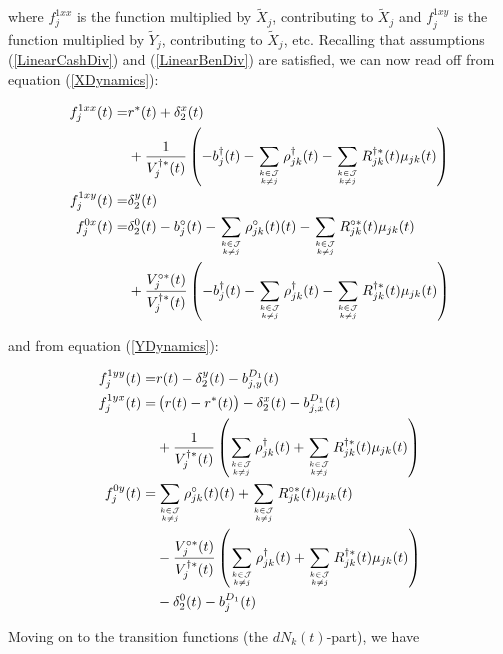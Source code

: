 \documentclass{article}
\newcommand{\1}[1]{\mathbbm{1}_{\left\lbrace #1 \right\rbrace}}
\theoremstyle{break}
\theoremstyle{remark}
\numberwithin{equation}{section}
\begin{document}
\begin{appendices}
where $f_j^{1xx}$ is the function multiplied by $\tilde{X}_j$, contributing to $\tilde{X}_j$ and $f_j^{1xy}$ is the function multiplied by $\tilde{Y}_j$, contributing to $\tilde{X}_j$, etc. Recalling that assumptions (\ref{LinearCashDiv}) and (\ref{LinearBenDiv}) are satisfied, we can now read off from equation (\ref{XDynamics}):

\begin{align*}
	f_j^{1xx}(t) =& r^*(t) + \delta_2^x(t) \\
	&+ \frac{1}{V_j^{\dagger *}(t)} \left( -b_j^\dagger(t) - \sum_{k \in \mathcal{J} \atop k \neq j} \rho_{jk}^\dagger(t) - \sum_{k \in \mathcal{J} \atop k \neq j} R_{jk}^{\dagger*}(t) \mu_{jk}(t) \right) \\
	f_j^{1xy}(t) =& \delta_2^y(t)\\
	f_j^{0x}(t) =& \delta_2^0(t) - b_j^\circ(t) - \sum_{k \in \mathcal{J} \atop k \neq j} \rho_{jk}^\circ(t)(t) - \sum_{k \in \mathcal{J} \atop k \neq j} R_{jk}^{\circ*}(t) \mu_{jk}(t) \\
	&+ \frac{V_j^{\circ *}(t)}{V_j^{\dagger *}(t)} \left( -b_j^\dagger(t) - \sum_{k \in \mathcal{J} \atop k \neq j} \rho_{jk}^\dagger(t) - \sum_{k \in \mathcal{J} \atop k \neq j} R_{jk}^{\dagger*}(t) \mu_{jk}(t) \right)
\end{align*}

and from equation (\ref{YDynamics}):

\begin{align*}
	f_j^{1yy}(t) =& r(t) - \delta_2^y(t) - b_{j,y}^{D_1}(t) \\
	f_j^{1yx}(t) =& \left( r(t) - r^*(t) \right) - \delta_2^x(t) - b_{j,x}^{D_1}(t) \\
	&+ \frac{1}{V_j^{\dagger *}(t)} \left( \sum_{k \in \mathcal{J} \atop k \neq j} \rho_{jk}^\dagger(t) + \sum_{k \in \mathcal{J} \atop k \neq j} R_{jk}^{\dagger*}(t) \mu_{jk}(t) \right) \\
	f_j^{0y}(t) =& \sum_{k \in \mathcal{J} \atop k \neq j} \rho_{jk}^\circ(t)(t) + \sum_{k \in \mathcal{J} \atop k \neq j} R_{jk}^{\circ*}(t) \mu_{jk}(t) \\
	&- \frac{V_j^{\circ *}(t)}{V_j^{\dagger *}(t)} \left( \sum_{k \in \mathcal{J} \atop k \neq j} \rho_{jk}^\dagger(t) + \sum_{k \in \mathcal{J} \atop k \neq j} R_{jk}^{\dagger*}(t) \mu_{jk}(t) \right) \\
	&- \delta_2^0(t) - b_j^{D_1} (t)
\end{align*}

Moving on to the transition functions (the $dN_k(t)$-part), we have


\end{appendices}
\end{document}
